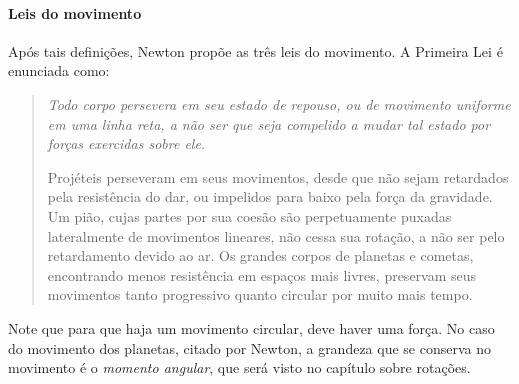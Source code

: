 \paragraph{Leis do movimento}

Após tais definições, Newton propõe as três leis do movimento. A Primeira Lei é enunciada como:
\begin{quote}
\emph{Todo corpo persevera em seu estado de repouso, ou de movimento uniforme em uma linha reta, a não ser que seja compelido a mudar tal estado por forças exercidas sobre ele.}

Projéteis perseveram em seus movimentos, desde que não sejam retardados pela resistência do dar, ou impelidos para baixo pela força da gravidade. Um pião, cujas partes por sua coesão são perpetuamente puxadas lateralmente de movimentos lineares, não cessa sua rotação, a não ser pelo retardamento devido ao ar. Os grandes corpos de planetas e cometas, encontrando menos resistência  em espaços mais livres, preservam seus movimentos tanto progressivo quanto circular por muito mais tempo.
\end{quote}

\noindent{}Note que para que haja um movimento circular, deve haver uma força. No caso do movimento dos planetas, citado por Newton, a grandeza que se conserva no movimento é o \emph{momento angular}, que será visto no capítulo sobre rotações.


